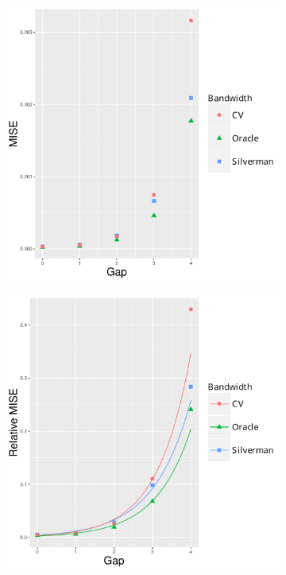 \begin{figure}[htbp]
    \centering
    \begin{subfigure}[b]{0.24\textwidth}
        \includegraphics[width=\textwidth]{results/by_pop_risk_distance/MISE-vs-population-risk-gap}
        \caption{}
        \label{fig:ise:p1.4_100_Gap_risk:mise}
    \end{subfigure}
    \begin{subfigure}[b]{0.24\textwidth}
        \includegraphics[width=\textwidth]{results/by_pop_risk_distance/RMISE-vs-population-risk-gap}

\end{subfigure}
\end{figure}
